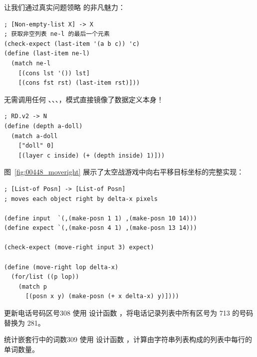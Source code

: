 让我们通过真实问题领略  的非凡魅力：

\begin{notebox}[样例 1：获取非空列表的末尾元素]
\begin{lstlisting}[language=BSL]
; [Non-empty-list X] -> X
; 获取非空列表 ne-l 的最后一个元素
(check-expect (last-item '(a b c)) 'c)
(define (last-item ne-l)
  (match ne-l
    [(cons lst '()) lst]
    [(cons fst rst) (last-item rst)]))
\end{lstlisting}
\end{notebox}
无需调用任何 、、、，模式直接镜像了数据定义本身！

\begin{notebox}[样例 2：俄罗斯套娃层数计算]
\begin{lstlisting}[language=BSL]
; RD.v2 -> N
(define (depth a-doll)
  (match a-doll
    ["doll" 0]
    [(layer c inside) (+ (depth inside) 1)]))
\end{lstlisting}
\end{notebox}

图~\ref{fig:00448_moveright} 展示了太空战游戏中向右平移目标坐标的完整实现：

\begin{lstlisting}[language=BSL]
; [List-of Posn] -> [List-of Posn]
; moves each object right by delta-x pixels

(define input  `(,(make-posn 1 1) ,(make-posn 10 14)))
(define expect `(,(make-posn 4 1) ,(make-posn 13 14)))

(check-expect (move-right input 3) expect)

(define (move-right lop delta-x)
  (for/list ((p lop))
    (match p
      [(posn x y) (make-posn (+ x delta-x) y)])))
\end{lstlisting}
\label{fig:00448_moveright}

\begin{exercise}{更新电话号码区号}{308}
使用  设计函数 ，将电话记录列表中所有区号为 713 的号码替换为 281。
\end{exercise}

\begin{exercise}{统计嵌套行中的词数}{309}
使用  设计函数 ，计算由字符串列表构成的列表中每行的单词数量。
\end{exercise}
